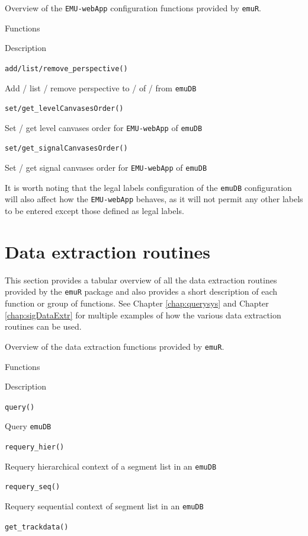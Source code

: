 \documentclass[]{book}
\theoremstyle{definition}
\theoremstyle{definition}
\theoremstyle{definition}
\theoremstyle{remark}
\begin{document}
\label{tab:emuRpackageDetails-emuWebAppConfig}Overview of the
\texttt{EMU-webApp} configuration functions provided by \texttt{emuR}.

Functions

Description

\texttt{add/list/remove\_perspective()}

Add / list / remove perspective to / of / from \texttt{emuDB}

\texttt{set/get\_levelCanvasesOrder()}

Set / get level canvases order for \texttt{EMU-webApp} of \texttt{emuDB}

\texttt{set/get\_signalCanvasesOrder()}

Set / get signal canvases order for \texttt{EMU-webApp} of
\texttt{emuDB}

It is worth noting that the legal labels configuration of the
\texttt{emuDB} configuration will also affect how the
\texttt{EMU-webApp} behaves, as it will not permit any other labels to
be entered except those defined as legal labels.

\hypertarget{sec:emuRpackageDetails-dataExtr}{%
\section{Data extraction
routines}\label{sec:emuRpackageDetails-dataExtr}}

This section provides a tabular overview of all the data extraction
routines provided by the \texttt{emuR} package and also provides a short
description of each function or group of functions. See Chapter
\ref{chap:querysys} and Chapter \ref{chap:sigDataExtr} for multiple
examples of how the various data extraction routines can be used.

\label{tab:emuRpackageDetails-dataExtr}Overview of the data extraction
functions provided by \texttt{emuR}.

Functions

Description

\texttt{query()}

Query \texttt{emuDB}

\texttt{requery\_hier()}

Requery hierarchical context of a segment list in an \texttt{emuDB}

\texttt{requery\_seq()}

Requery sequential context of segment list in an \texttt{emuDB}

\texttt{get\_trackdata()}
\end{document}
